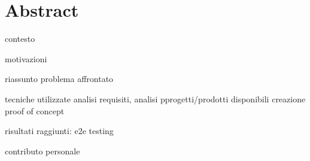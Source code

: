 \chapter*{Abstract} %
\label{abtract}


contesto 

motivazioni

riassunto problema affrontato

tecniche utilizzate
analisi requisiti, 
analisi pprogetti/prodotti disponibili
creazione proof of concept


risultati raggiunti: e2e testing

contributo personale


\newpage
